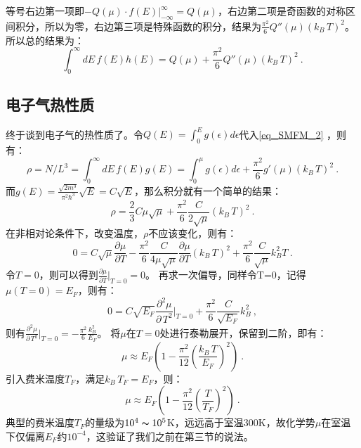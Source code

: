 等号右边第一项即$-Q(\mu)\cdot f(E)\bigg|_{-\infty}^\infty=Q(\mu)$，右边第二项是奇函数的对称区间积分，所以为零，右边第三项是特殊函数的积分，结果为$\frac{\pi^2}{6}Q''(\mu)(k_B\,T)^2$。所以总的结果为：
\begin{equation}\label{eq_SMFM_2}
\int_0^{\infty} dE\,f(E)h(E)=Q(\mu)+\frac{\pi^2}{6}Q''(\mu)(k_B\,T)^2~.
\end{equation}

\subsection{电子气热性质}
终于谈到电子气的热性质了。令$Q(E)=\int_0^{E} g(\epsilon)d\epsilon$代入\autoref{eq_SMFM_2} ，则有：
\begin{equation}
\rho=N/L^3=\int_0^{\infty} dE\,f(E)g(E)=\int_0^{\mu} g(\epsilon)d\epsilon+\frac{\pi^2}{6}g'(\mu)(k_B\,T)^2~.
\end{equation}
而$g(E)=\frac{\sqrt{2m^3}}{\pi^2\hbar^3}\sqrt{E}=C\sqrt{E}$，那么积分就有一个简单的结果：
\begin{equation}
\rho=\frac{2}{3}C\mu\sqrt{\mu}+\frac{\pi^2}{6}\frac{C}{2\sqrt{\mu}}(k_B\,T)^2~.
\end{equation}
在非相对论条件下，改变温度，$\rho$不应该变化，则有：
\begin{equation}
0=C\sqrt{\mu}\frac{\partial \mu}{\partial T} -\frac{\pi^2}{6}\frac{C}{4\mu\sqrt{\mu}}\frac{\partial \mu}{\partial T}(k_B\,T)^2+\frac{\pi^2}{6}\frac{C}{\sqrt{\mu}}k_B^2  T~.
\end{equation}
令$T=0$，则可以得到$\frac{\partial \mu}{\partial T}\bigg|_{T=0}=0$。
再求一次偏导，同样令T=0，记得$\mu(T=0)=E_F$，则有：
\begin{equation}
0=C\sqrt{E_F}\frac{\partial ^2\mu}{\partial\, T^2}\bigg|_{T=0}+\frac{\pi^2}{6}\frac{C}{\sqrt{E_F}}k_B^2~,
\end{equation}
则有$\frac{\partial ^2\mu}{\partial\, T^2}\bigg|_{T=0}=-\frac{\pi^2}{6}\frac{k_B^2}{E_F}$。
将$\mu$在$T=0$处进行泰勒展开，保留到二阶，即有：
\begin{equation}
\mu\approx E_F\left(1-\frac{\pi^2}{12}(\frac{k_B\,T}{E_F})^2\right)~.
\end{equation}
引入费米温度$T_F$，满足$k_B\,T_F=E_F$，则：
\begin{equation}\label{eq_SMFM_3}
\mu\approx E_F\left(1-\frac{\pi^2}{12}(\frac{T}{T_F})^2\right)~.
\end{equation}
典型的费米温度$T_F$的量级为$10^4\thicksim 10^5$K，远远高于室温300K，故化学势$\mu$在室温下仅偏离$E_F$约$10^{-4}$，这验证了我们之前在第三节的说法。

